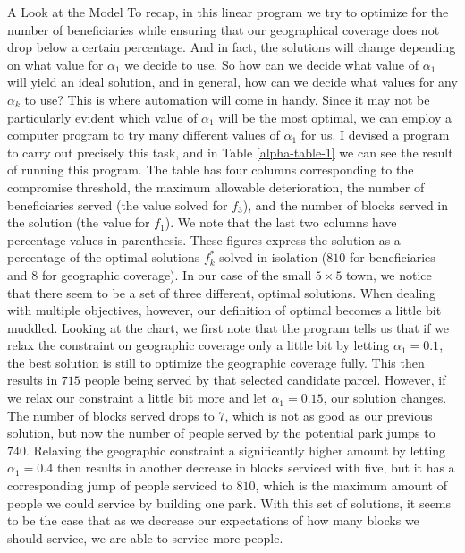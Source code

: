 \documentclass[12pt]{pom_thesis}
\theoremstyle{definition}
\begin{document}
\begin{chapter}{A Look at the Model}
To recap, in this linear program we try to optimize for the number of beneficiaries while ensuring that our geographical coverage does not drop below a certain percentage. And in fact, the solutions will change depending on what value for $\alpha_1$ we decide to use. So how can we decide what value of $\alpha_1$ will yield an ideal solution, and in general, how can we decide what values for any $\alpha_k$ to use? This is where automation will come in handy. Since it may not be particularly evident which value of $\alpha_1$ will be the most optimal, we can employ a computer program to try many different values of $\alpha_1$ for us. I devised a program to carry out precisely this task, and in Table \ref{alpha-table-1} we can see the result of running this program. The table has four columns corresponding to the compromise threshold, the maximum allowable deterioration, the number of beneficiaries served (the value solved for $f_3$), and the number of blocks served in the solution (the value for $f_1$). We note that the last two columns have percentage values in parenthesis. These figures express the solution as a percentage of the optimal solutions $f_k^*$ solved in isolation ($810$ for beneficiaries and $8$ for geographic coverage). In our case of the small $5 \times 5$ town, we notice that there seem to be a set of three different, optimal solutions. When dealing with multiple objectives, however, our definition of optimal becomes a little bit muddled. Looking at the chart, we first note that the program tells us that if we relax the constraint on geographic coverage only a little bit by letting $\alpha_1 = 0.1$, the best solution is still to optimize the geographic coverage fully. This then results in $715$ people being served by that selected candidate parcel. However, if we relax our constraint a little bit more and let $\alpha_1 = 0.15$, our solution changes. The number of blocks served drops to $7$, which is not as good as our previous solution, but now the number of people served by the potential park jumps to $740$. Relaxing the geographic constraint a significantly higher amount by letting $\alpha_1 = 0.4$ then results in another decrease in blocks serviced with five, but it has a corresponding jump of people serviced to $810$, which is the maximum amount of people we could service by building one park. With this set of solutions, it seems to be the case that as we decrease our expectations of how many blocks we should service, we are able to service more people. \\


\end{chapter}
\end{document}
